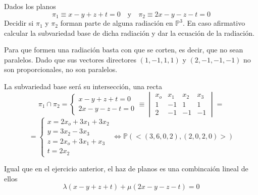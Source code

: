 \begin{ejer}
    [24] Dados los planos 
    $$\pi_1 \equiv x - y + z + t = 0 \quad \text{y} \quad \pi_2 \equiv 2x - y - z - t = 0$$ 
    Decidir si $\pi_1$ y $\pi_2$ forman parte de alguna radiaci\'on en $\mathbb P^3$. En caso afirmativo calcular la subvariedad base de dicha radiaci\'on y dar la ecuaci\'on de la radiaci\'on.
\end{ejer}
\begin{sol}
    Para que formen una radiaci\'on basta con que se corten, es decir, que no sean paralelos. Dado que sus vectores directores $(1,-1,1,1)$ y $(2,-1,-1,-1)$ no son proporcionales, no son paralelos.

    La subvariedad base ser\'a su intersecci\'on, una recta
    $$\pi_1 \cap \pi_2=\begin{cases}
         x - y + z + t = 0 \\ 2x - y - z - t = 0
    \end{cases}\equiv \begin{vmatrix}
        x_o & x_1 & x_2 & x_3 \\ 1 & -1 & 1 & 1 \\ 2 & -1 & -1 & -1
    \end{vmatrix} = $$
    $$=\begin{cases}
        x=2x_o+3x_1+3x_2 \\ y=3x_2-3x_3 \\ z=2x_o+3x_1+x_3 \\ t=2x_2
    \end{cases}\iff \mathbb P(<(3,6,0,2),(2,0,2,0)>)$$

    Igual que en el ejercicio anterior, el haz de planos es una combincai\'on lineal de ellos 
    $$\lambda(x - y + z + t)+\mu( 2x - y - z - t) =0$$
    
\end{sol}
